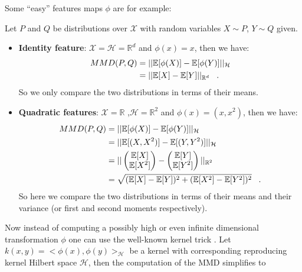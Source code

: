 Some ``easy'' features maps $\phi$ are for example:
\begin{ex}
    Let $P$ and $Q$ be distributions over $\mathcal{X}$ with random variables $X \sim P$, $Y \sim Q$ given.
    \begin{itemize}
        \item \textbf{Identity feature}: $\mathcal{X}=\mathcal{H}=\mathbb{R}^d$ and $\phi(x)=x$, then we have:
        \begin{align}
            MMD(P,Q) &= || \mathbb{E}[\phi(X)] - \mathbb{E}[\phi(Y)] ||_\mathcal{H} \nonumber \\
            &= || \mathbb{E}[X] - \mathbb{E}[Y] ||_{\mathbb{R}^d} \;\;\;.
        \end{align}
        So we only compare the two distributions in terms of their means. 

        \item \textbf{Quadratic features}: $\mathcal{X}=\mathbb{R}$ ,$\mathcal{H}=\mathbb{R}^2$ and $\phi(x)=(x, x^2)$, then we have:
        \begin{align}
            MMD(P,Q) &= || \mathbb{E}[\phi(X)] - \mathbb{E}[\phi(Y)] ||_\mathcal{H} \nonumber \\
            &= || \mathbb{E}[(X, X^2)] - \mathbb{E}[(Y, Y^2)] ||_\mathcal{H} \nonumber \\
            &= || \begin{pmatrix}
                \mathbb{E}[X] \\ \mathbb{E}[X^2]
            \end{pmatrix} - \begin{pmatrix}
                \mathbb{E}[Y] \\ \mathbb{E}[Y^2]
            \end{pmatrix} ||_{\mathbb{R}^2} \nonumber \\
            &= \sqrt{(\mathbb{E}[X] - \mathbb{E}[Y])^2 + (\mathbb{E}[X^2] - \mathbb{E}[Y^2])^2} \;\;\;.
        \end{align}
        So here we compare the two distributions in terms of their means and their variance (or first and second moments respectively).
    \end{itemize}
\end{ex}

Now instead of computing a possibly high or even infinite dimensional transformation $\phi$ one can use the well-known kernel trick \parencite{Scholkopf2001AGR}. Let $k(x,y)=<\phi(x), \phi(y)>_{\mathcal{H}}$ be a kernel with corresponding reproducing kernel Hilbert space $\mathcal{H}$, then the computation of the MMD simplifies to

